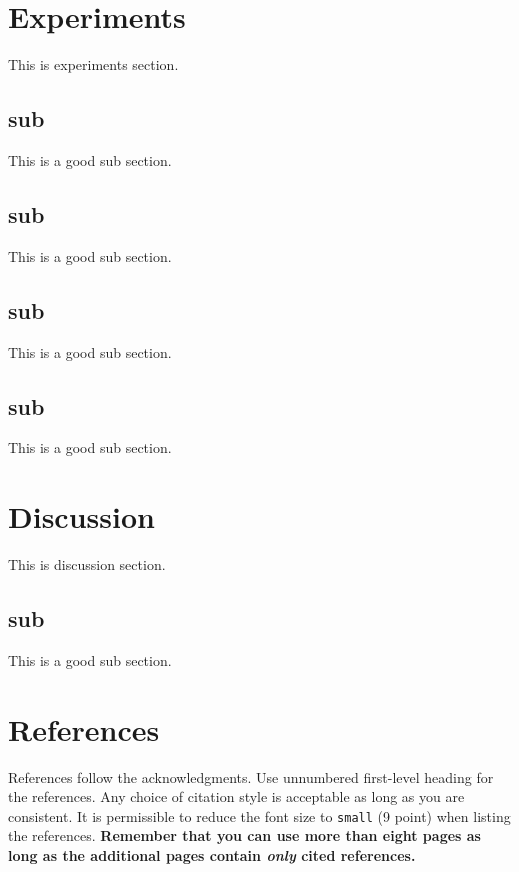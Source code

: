 \documentclass{article}
\begin{document}
\section{Experiments}
\label{experiments}

This is experiments section.

\subsection{sub}

This is a good sub section.

\subsection{sub}

This is a good sub section.

\subsection{sub}

This is a good sub section.

\subsection{sub}

This is a good sub section.

\section{Discussion}

This is discussion section.

\subsection{sub}

This is a good sub section.

\section*{References}

References follow the acknowledgments. Use unnumbered first-level heading for
the references. Any choice of citation style is acceptable as long as you are
consistent. It is permissible to reduce the font size to \verb+small+ (9 point)
when listing the references. {\bf Remember that you can use more than eight
  pages as long as the additional pages contain \emph{only} cited references.}
\medskip
\end{document}
